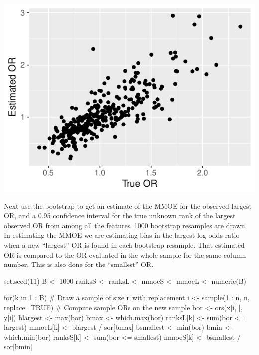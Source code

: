 \begin{Schunk}
\centerline{\includegraphics{hdata-simbd-1} }

\end{Schunk}

Next use the bootstrap to get an estimate of the MMOE for the observed
largest OR, and a 0.95 confidence 
interval for the true unknown rank of the largest observed OR from
among all the features.  1000 bootstrap resamples are drawn.  In
estimating the MMOE we are estimating bias in the largest log odds
ratio when a new ``largest'' OR is found in each bootstrap resample.
That estimated OR is compared to the OR evaluated in the whole sample
for the same column number.  This is also done for the ``smallest'' OR.

\begin{Schunk}
\begin{Sinput}
set.seed(11)
B <- 1000
ranksS <- ranksL <- mmoeS <- mmoeL <- numeric(B)

for(k in 1 : B) {
  # Draw a sample of size n with replacement
  i <- sample(1 : n, n, replace=TRUE)
  # Compute sample ORs on the new sample
  bor      <- ors(x[i, ], y[i])
  blargest <- max(bor)
  bmax     <- which.max(bor)
  ranksL[k] <- sum(bor <= largest)
  mmoeL[k]  <- blargest / sor[bmax]
  bsmallest <- min(bor)
  bmin      <- which.min(bor)
  ranksS[k] <- sum(bor <= smallest)
  mmoeS[k]  <- bsmallest / sor[bmin]
}
\end{Sinput}
\end{Schunk}

